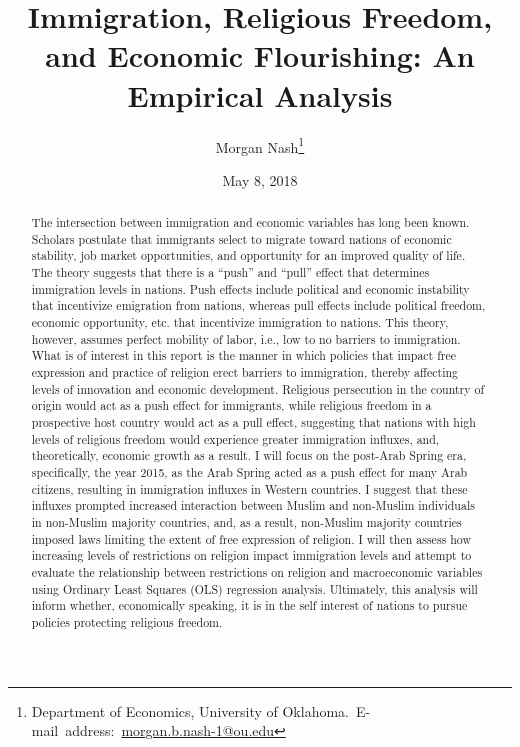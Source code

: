\documentclass[12pt,english]{article}
\begin{document}
\begin{singlespace}
\title{Immigration, Religious Freedom, and Economic Flourishing: An Empirical Analysis}
\end{singlespace}

\author{Morgan Nash\thanks{Department of Economics, University of Oklahoma.\
E-mail~address:~\href{mailto:morgan.b.nash-1@ou.edu}{morgan.b.nash-1@ou.edu}}}

\date{May 8, 2018}

\maketitle
\begin{abstract}
\begin{singlespace}
The intersection between immigration and economic variables has long been known. Scholars postulate that immigrants select to migrate toward nations of economic stability, job market opportunities, and opportunity for an improved quality of life. The theory suggests that there is a “push” and “pull” effect that determines immigration levels in nations. Push effects  include political and economic instability that incentivize emigration from nations, whereas pull effects include political freedom, economic opportunity, etc. that incentivize immigration to nations. This theory, however, assumes perfect mobility of labor, i.e., low to no barriers to immigration. What is of interest in this report is the manner in which policies that impact free expression and practice of religion erect barriers to immigration, thereby affecting levels of innovation and economic development. Religious persecution in the country of origin would act as a push effect for immigrants, while religious freedom in a prospective host country would act as a pull effect, suggesting that nations with high levels of religious freedom would experience greater immigration influxes, and, theoretically, economic growth as a result. I will focus on the post-Arab Spring era, specifically, the year 2015, as the Arab Spring acted as a push effect for many Arab citizens, resulting in immigration influxes in Western countries. I suggest that these influxes prompted increased interaction between Muslim and non-Muslim individuals in non-Muslim majority countries, and, as a result, non-Muslim majority countries imposed laws limiting the extent of free expression of religion.  I will then assess how increasing levels of restrictions on religion impact immigration levels and attempt to evaluate the relationship between restrictions on religion and macroeconomic variables using Ordinary Least Squares (OLS) regression analysis. Ultimately, this analysis will inform whether, economically speaking, it is in the self interest of nations to pursue policies protecting religious freedom.
\end{singlespace}

\end{abstract}
\vfill{}
\end{document}
